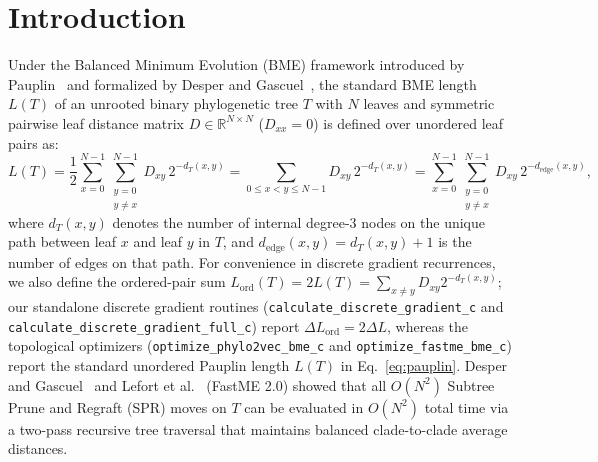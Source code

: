 \documentclass[11pt,a4paper]{article}
\theoremstyle{definition}
\begin{document}
\begin{abstract}
80GB HBM3, $5.15\times$ end-to-end ($7.70\times$ Stage-3) scaling on 8$\times$ NVIDIA H100 at $N = 40{,}000$ ($158.36\text{ ms}$ for $3.2 \times 10^9$ moves), distributed column-sharded full-tree execution across 8$\times$ NVIDIA H100 up to $N = 380{,}000$ taxa ($2.89 \times 10^{11}$ candidate moves in $205.45\text{ s}$ across $569.9\text{ GB}$ HBM3), and clade-condensed minibatch optimization at $N = 1{,}000{,}000$, $5{,}000{,}000$, and $10{,}000{,}000$ taxa ($3.43\text{ s}$, $17.82\text{ s}$, and $39.20\text{ s}$ per full epoch on 8$\times$ NVIDIA H100 using only $7.8\text{ GB}$ VRAM/GPU).
\end{abstract}

\tableofcontents
\newpage

\section{Introduction}

Under the Balanced Minimum Evolution (BME) framework introduced by Pauplin~\cite{pauplin2000direct} and formalized by Desper and Gascuel~\cite{desper2002fast}, the standard BME length $L(T)$ of an unrooted binary phylogenetic tree $T$ with $N$ leaves and symmetric pairwise leaf distance matrix $D \in \mathbb{R}^{N \times N}$ ($D_{xx} = 0$) is defined over unordered leaf pairs as:
\begin{equation}
L(T) = \frac{1}{2} \sum_{x=0}^{N-1} \sum_{\substack{y=0 \\ y \neq x}}^{N-1} D_{xy} \, 2^{-d_T(x, y)} = \sum_{0 \le x < y \le N-1} D_{xy} \, 2^{-d_T(x, y)} = \sum_{x=0}^{N-1} \sum_{\substack{y=0 \\ y \neq x}}^{N-1} D_{xy} \, 2^{-d_{\text{edge}}(x, y)},
\label{eq:pauplin}
\end{equation}
where $d_T(x, y)$ denotes the number of internal degree-3 nodes on the unique path between leaf $x$ and leaf $y$ in $T$, and $d_{\text{edge}}(x, y) = d_T(x, y) + 1$ is the number of edges on that path. For convenience in discrete gradient recurrences, we also define the ordered-pair sum $L_{\text{ord}}(T) = 2 L(T) = \sum_{x \neq y} D_{xy} 2^{-d_T(x,y)}$; our standalone discrete gradient routines (\texttt{calculate\_discrete\_gradient\_c} and \texttt{calculate\_discrete\_gradient\_full\_c}) report $\Delta L_{\text{ord}} = 2 \Delta L$, whereas the topological optimizers (\texttt{optimize\_phylo2vec\_bme\_c} and \texttt{optimize\_fastme\_bme\_c}) report the standard unordered Pauplin length $L(T)$ in Eq.~\eqref{eq:pauplin}. Desper and Gascuel~\cite{desper2002fast} and Lefort et al.~\cite{lefort2015fastme} (FastME 2.0) showed that all $O(N^2)$ Subtree Prune and Regraft (SPR) moves on $T$ can be evaluated in $O(N^2)$ total time via a two-pass recursive tree traversal that maintains balanced clade-to-clade average distances.
\end{document}
